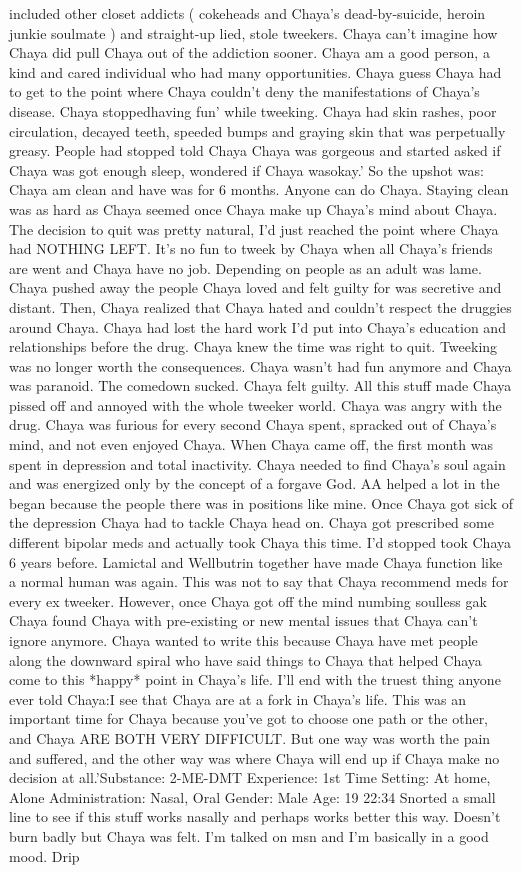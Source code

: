 \documentclass[12pt]{book}
\begin{document}
included other closet addicts ( cokeheads and Chaya's dead-by-suicide, heroin junkie soulmate ) and straight-up lied, stole tweekers. Chaya can't imagine how Chaya did pull Chaya out of the addiction sooner. Chaya am a good person, a kind and cared individual who had many opportunities. Chaya guess Chaya had to get to the point where Chaya couldn't deny the manifestations of Chaya's disease. Chaya stoppedhaving fun' while tweeking. Chaya had skin rashes, poor circulation, decayed teeth, speeded bumps and graying skin that was perpetually greasy. People had stopped told Chaya Chaya was gorgeous and started asked if Chaya was got enough sleep, wondered if Chaya wasokay.' So the upshot was: Chaya am clean and have was for 6 months. Anyone can do Chaya. Staying clean was as hard as Chaya seemed once Chaya make up Chaya's mind about Chaya. The decision to quit was pretty natural, I'd just reached the point where Chaya had NOTHING LEFT. It's no fun to tweek by Chaya when all Chaya's friends are went and Chaya have no job. Depending on people as an adult was lame. Chaya pushed away the people Chaya loved and felt guilty for was secretive and distant. Then, Chaya realized that Chaya hated and couldn't respect the druggies around Chaya. Chaya had lost the hard work I'd put into Chaya's education and relationships before the drug. Chaya knew the time was right to quit. Tweeking was no longer worth the consequences. Chaya wasn't had fun anymore and Chaya was paranoid. The comedown sucked. Chaya felt guilty. All this stuff made Chaya pissed off and annoyed with the whole tweeker world. Chaya was angry with the drug. Chaya was furious for every second Chaya spent, spracked out of Chaya's mind, and not even enjoyed Chaya. When Chaya came off, the first month was spent in depression and total inactivity. Chaya needed to find Chaya's soul again and was energized only by the concept of a forgave God. AA helped a lot in the began because the people there was in positions like mine. Once Chaya got sick of the depression Chaya had to tackle Chaya head on. Chaya got prescribed some different bipolar meds and actually took Chaya this time. I'd stopped took Chaya 6 years before. Lamictal and Wellbutrin together have made Chaya function like a normal human was again. This was not to say that Chaya recommend meds for every ex tweeker. However, once Chaya got off the mind numbing soulless gak Chaya found Chaya with pre-existing or new mental issues that Chaya can't ignore anymore. Chaya wanted to write this because Chaya have met people along the downward spiral who have said things to Chaya that helped Chaya come to this *happy* point in Chaya's life. I'll end with the truest thing anyone ever told Chaya:I see that Chaya are at a fork in Chaya's life. This was an important time for Chaya because you've got to choose one path or the other, and Chaya ARE BOTH VERY DIFFICULT. But one way was worth the pain and suffered, and the other way was where Chaya will end up if Chaya make no decision at all.'Substance: 2-ME-DMT Experience: 1st Time Setting: At home, Alone Administration: Nasal, Oral Gender: Male Age: 19 22:34 Snorted a small line to see if this stuff works nasally and perhaps works better this way. Doesn't burn badly but Chaya was felt. I'm talked on msn and I'm basically in a good mood. Drip 
\end{document}
